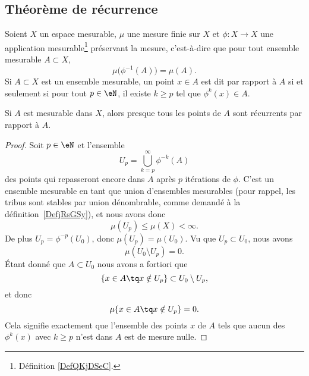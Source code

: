 \subsection{Théorème de récurrence}

Soient \( X\) un espace mesurable, \( \mu\) une mesure finie sur \( X\) et \( \phi\colon X\to X\) une application mesurable\footnote{Définition \ref{DefQKjDSeC}.} préservant la mesure, c'est-à-dire que pour tout ensemble mesurable \( A\subset X\),
\begin{equation}
	\mu\big( \phi^{-1}(A) \big)=\mu(A).
\end{equation}
Si \( A\subset X\) est un ensemble mesurable, un point \( x\in A\) est dit  par rapport à \( A\) si et seulement si pour tout \( p\in \eN\), il existe \( k\geq p\) tel que \( \phi^k(x)\in A\).

\begin{theorem}     \label{ThoYnLNEL}
	Si \( A\) est mesurable dans \( X\), alors presque tous les points de \( A\) sont récurrents par rapport à \( A\).
\end{theorem}

\begin{proof}
	Soit \( p\in \eN\) et l'ensemble
	\begin{equation}
		U_p=\bigcup_{k=p}^{\infty}\phi^{-k}(A)
	\end{equation}
	des points qui repasseront encore dans \( A\) après \( p\) itérations  de \( \phi\). C'est un ensemble mesurable en tant que union d'ensembles mesurables (pour rappel, les tribus sont stables par union dénombrable, comme demandé à la définition~\ref{DefjRsGSy}), et nous avons donc
	\begin{equation}
		\mu(U_p)\leq \mu(X)<\infty.
	\end{equation}
	De plus \( U_p=\phi^{-p}(U_0)\), donc \( \mu(U_p)=\mu(U_0)\). Vu que \( U_p\subset U_0\), nous avons
	\begin{equation}
		\mu(U_0\setminus U_p)=0.
	\end{equation}
	Étant donné que \( A\subset U_0\) nous avons a fortiori que
	\begin{equation}
		\{ x\in A\tq x\notin U_p \}\subset U_0\setminus U_p,
	\end{equation}
	et donc
	\begin{equation}
		\mu\{ x\in A\tq x\notin U_p \}=0.
	\end{equation}
	Cela signifie exactement que l'ensemble des points \( x\) de \( A\) tels que aucun des \( \phi^k(x)\) avec \( k\geq p\) n'est dans \( A\) est de mesure nulle.
\end{proof}

